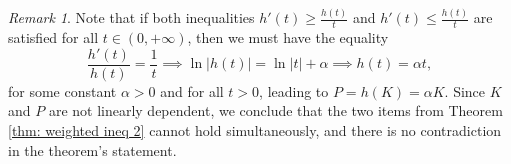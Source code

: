\documentclass[11pt]{article}
\theoremstyle{definition}
\theoremstyle{remark}
\newtheorem{remark}[statement]{Remark}
\begin{document}
\begin{remark}
    Note that if both inequalities $h'(t)\geq\frac{h(t)}{t}$ and $h'(t)\leq\frac{h(t)}{t}$ are satisfied for all $t\in(0,+\infty)$, then we must have the equality
    \begin{equation*}
        \frac{h'(t)}{h(t)}=\frac{1}{t}\implies\ln|h(t)|=\ln|t|+\alpha \implies h(t)=\alpha t, 
    \end{equation*}
    for some constant $\alpha >0$ and for all $t>0$, leading to $P=h(K)=\alpha K$. Since $K$ and $P$ are not linearly dependent, we conclude that the two items from Theorem \ref{thm: weighted ineq 2} cannot hold simultaneously, and there is no contradiction in the theorem's statement.
\end{remark}
\end{document}
